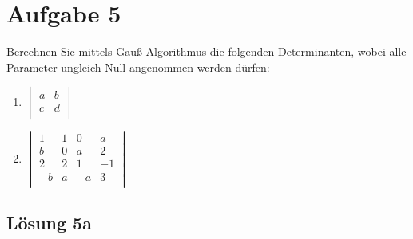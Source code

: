 \documentclass[main.tex]{subfiles}
\begin{document}
\section{Aufgabe 5}
Berechnen Sie mittels Gauß-Algorithmus die folgenden Determinanten, wobei alle Parameter ungleich Null angenommen werden dürfen:

\begin{enumerate}
    \item $\begin{vmatrix}
        a & b \\
        c & d \\
    \end{vmatrix}$
    \item $\begin{vmatrix}
         1 & 1 &  0 &  a \\
         b & 0 &  a &  2 \\
         2 & 2 &  1 & -1 \\
        -b & a & -a &  3 \\
    \end{vmatrix}$
\end{enumerate}

\subsection{Lösung 5a}
\end{document}
